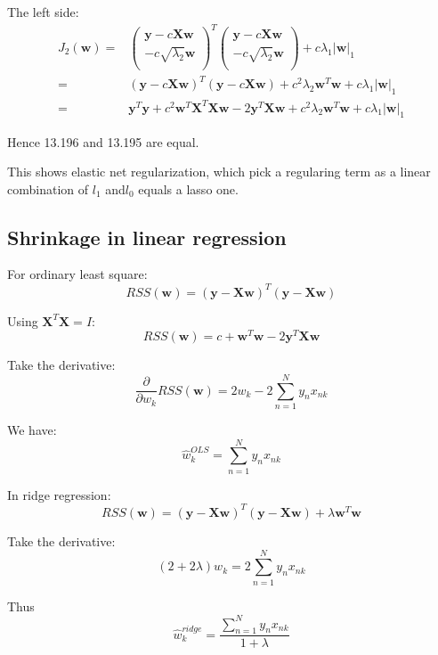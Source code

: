 \documentclass[UTF8]{ctexart}
\begin{document}
The left side:
\begin{align}
J_{2}(\textbf{w})=&\begin{pmatrix}
\textbf{y}-c\textbf{X}\textbf{w} \\
-c \sqrt{\lambda_{2}}\textbf{w} \\
\end{pmatrix}^{T}\begin{pmatrix}
\textbf{y}-c\textbf{X}\textbf{w} \\
-c \sqrt{\lambda_{2}}\textbf{w} \\
\end{pmatrix}+c \lambda_{1}|\textbf{w}|_{1}\nonumber \\
=&(\textbf{y}-c\textbf{X}\textbf{w})^{T}(\textbf{y}-c\textbf{X}\textbf{w})+c^{2}\lambda_{2}\textbf{w}^{T}\textbf{w} +c \lambda_{1}|\textbf{w}|_{1}\nonumber \\
=&\textbf{y}^{T}\textbf{y}+ c^{2}\textbf{w}^{T}\textbf{X}^{T}\textbf{X}\textbf{w} - 2\textbf{y}^{T}\textbf{X}\textbf{w}+c^{2}\lambda_{2}\textbf{w}^{T}\textbf{w}+c\lambda_{1}|\textbf{w}|_{1}\nonumber
\end{align}

Hence 13.196 and 13.195 are equal.

This shows elastic net regularization, which pick a regularing term as a linear combination of $l_{1}$ and$l_{0}$ equals a lasso one.

\subsection{Shrinkage in linear regression}
For ordinary least square:
$$RSS(\textbf{w}) = (\textbf{y}-\textbf{X}\textbf{w})^{T}(\textbf{y}-\textbf{X}\textbf{w})$$

Using $\textbf{X}^{T}\textbf{X}=I$:
$$RSS(\textbf{w})=c+\textbf{w}^{T}\textbf{w}-2\textbf{y}^{T}\textbf{X}\textbf{w}$$

Take the derivative:
$$\frac{\partial}{\partial w_{k}}RSS(\textbf{w})=2w_{k}-2\sum_{n=1}^{N}y_{n}x_{nk}$$

We have:
$$\hat{w}_{k}^{OLS}=\sum_{n=1}^{N}y_{n}x_{nk}$$

In ridge regression:
$$RSS(\textbf{w})=(\textbf{y}-\textbf{X}\textbf{w})^{T}(\textbf{y}-\textbf{X}\textbf{w}) + \lambda \textbf{w}^{T}\textbf{w}$$

Take the derivative:
$$(2+2\lambda)w_{k} = 2\sum_{n=1}^{N}y_{n}x_{nk}$$

Thus
$$\hat{w}_{k}^{ridge}=\frac{\sum_{n=1}^{N}y_{n}x_{nk}}{1+\lambda}$$
\end{document}
